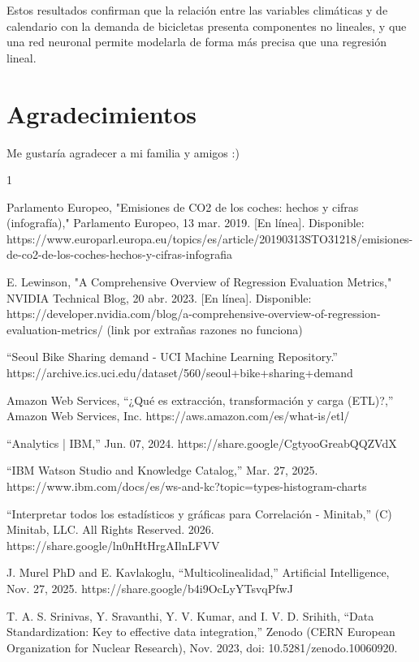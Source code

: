 \documentclass[10pt,journal,compsoc]{IEEEtran}
\begin{document}
Estos resultados confirman que la relación entre las variables climáticas y de calendario con la demanda de bicicletas presenta componentes no lineales, y que una red neuronal permite modelarla de forma más precisa que una regresión lineal.



 \section*{Agradecimientos}
Me gustaría agradecer a mi familia y amigos :)


 \newpage
\begin{thebibliography}{1}

Parlamento Europeo, "Emisiones de CO2 de los coches: hechos y cifras (infografía)," Parlamento Europeo, 13 mar. 2019. [En línea]. Disponible: https://www.europarl.europa.eu/topics/es/article/20190313STO31218/emisiones-de-co2-de-los-coches-hechos-y-cifras-infografia

E. Lewinson, "A Comprehensive Overview of Regression Evaluation Metrics," NVIDIA Technical Blog, 20 abr. 2023. [En línea]. Disponible: https://developer.nvidia.com/blog/a-comprehensive-overview-of-regression-evaluation-metrics/ (link por extrañas razones no funciona)

“Seoul Bike Sharing demand - UCI Machine Learning Repository.” https://archive.ics.uci.edu/dataset/560/seoul+bike+sharing+demand

Amazon Web Services, “¿Qué es extracción, transformación y carga (ETL)?,” Amazon Web Services, Inc. https://aws.amazon.com/es/what-is/etl/

“Analytics | IBM,” Jun. 07, 2024. https://share.google/CgtyooGreabQQZVdX

“IBM Watson Studio and Knowledge Catalog,” Mar. 27, 2025. https://www.ibm.com/docs/es/ws-and-kc?topic=types-histogram-charts

“Interpretar todos los estadísticos y gráficas para Correlación - Minitab,” (C) Minitab, LLC. All Rights Reserved. 2026.  https://share.google/ln0nHtHrgAIlnLFVV

J. Murel PhD and E. Kavlakoglu, “Multicolinealidad,” Artificial Intelligence, Nov. 27, 2025. https://share.google/b4i9OcLyYTsvqPfwJ

T. A. S. Srinivas, Y. Sravanthi, Y. V. Kumar, and I. V. D. Srihith, “Data Standardization: Key to effective data integration,” Zenodo (CERN European Organization for Nuclear Research), Nov. 2023, doi: 10.5281/zenodo.10060920.


\end{thebibliography}
\end{document}
